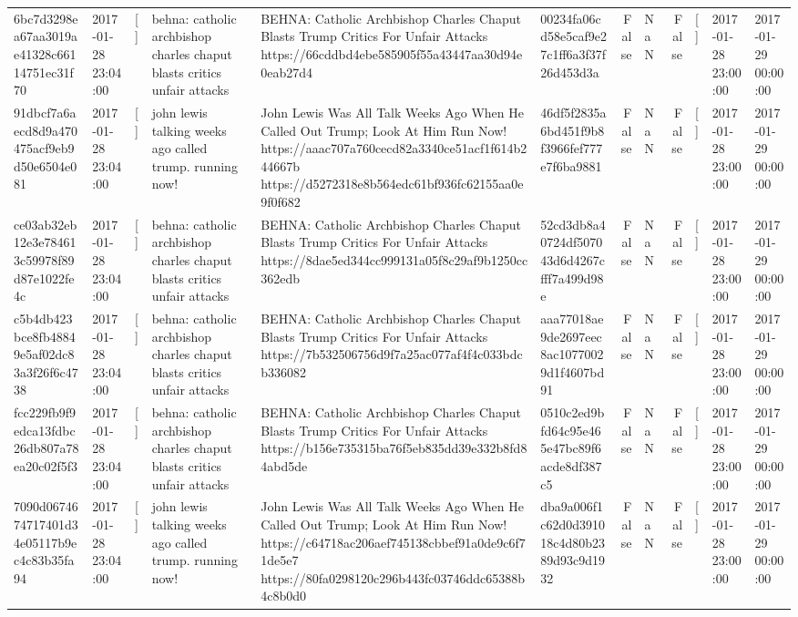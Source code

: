 \begin{tabular}{llllllrlrlll}
6bc7d3298ea67aa3019ae41328c66114751ec31f70 & 2017-01-28 23:04:00 & [] & behna: catholic archbishop charles chaput blasts critics unfair attacks & BEHNA: Catholic Archbishop Charles Chaput Blasts Trump Critics For Unfair Attacks https://66cddbd4ebe585905f55a43447aa30d94e0eab27d4 & 00234fa06cd58e5caf9e27c1ff6a3f37f26d453d3a & False & NaN & False & [] & 2017-01-28 23:00:00 & 2017-01-29 00:00:00 \\
91dbcf7a6aecd8d9a470475acf9eb9d50e6504e081 & 2017-01-28 23:04:00 & [] & john lewis talking weeks ago called trump. running now! & John Lewis Was All Talk Weeks Ago When He Called Out Trump; Look At Him Run Now! https://aaac707a760cecd82a3340ce51acf1f614b244667b https://d5272318e8b564edc61bf936fc62155aa0e9f0f682 & 46df5f2835a6bd451f9b8f3966fef777e7f6ba9881 & False & NaN & False & [] & 2017-01-28 23:00:00 & 2017-01-29 00:00:00 \\
ce03ab32eb12e3e784613c59978f89d87e1022fe4c & 2017-01-28 23:04:00 & [] & behna: catholic archbishop charles chaput blasts critics unfair attacks & BEHNA: Catholic Archbishop Charles Chaput Blasts Trump Critics For Unfair Attacks https://8dae5ed344cc999131a05f8c29af9b1250cc362edb & 52cd3db8a40724df507043d6d4267cfff7a499d98e & False & NaN & False & [] & 2017-01-28 23:00:00 & 2017-01-29 00:00:00 \\
c5b4db423bce8fb48849e5af02dc83a3f26f6c4738 & 2017-01-28 23:04:00 & [] & behna: catholic archbishop charles chaput blasts critics unfair attacks & BEHNA: Catholic Archbishop Charles Chaput Blasts Trump Critics For Unfair Attacks https://7b532506756d9f7a25ac077af4f4c033bdcb336082 & aaa77018ae9de2697eec8ac10770029d1f4607bd91 & False & NaN & False & [] & 2017-01-28 23:00:00 & 2017-01-29 00:00:00 \\
fcc229fb9f9edca13fdbc26db807a78ea20c02f5f3 & 2017-01-28 23:04:00 & [] & behna: catholic archbishop charles chaput blasts critics unfair attacks & BEHNA: Catholic Archbishop Charles Chaput Blasts Trump Critics For Unfair Attacks https://b156e735315ba76f5eb835dd39e332b8fd84abd5de & 0510c2ed9bfd64c95e465e47bc89f6acde8df387c5 & False & NaN & False & [] & 2017-01-28 23:00:00 & 2017-01-29 00:00:00 \\
7090d0674674717401d34e05117b9ec4c83b35fa94 & 2017-01-28 23:04:00 & [] & john lewis talking weeks ago called trump. running now! & John Lewis Was All Talk Weeks Ago When He Called Out Trump; Look At Him Run Now! https://c64718ac206aef745138cbbef91a0de9c6f71de5e7 https://80fa0298120c296b443fc03746ddc65388b4c8b0d0 & dba9a006f1c62d0d391018c4d80b2389d93c9d1932 & False & NaN & False & [] & 2017-01-28 23:00:00 & 2017-01-29 00:00:00 \\

\end{tabular}
